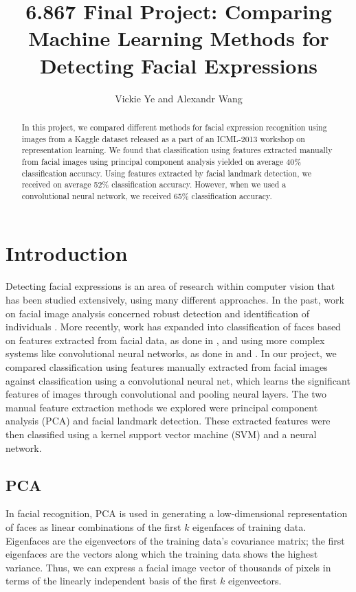 \documentclass[10pt, twocolumn, twoside]{article}
\title{6.867 Final Project: Comparing Machine Learning Methods for Detecting Facial Expressions} %
\date{}
\author {Vickie Ye and Alexandr Wang}
\begin{document}
\maketitle


\begin{abstract}
In this project, we compared different methods for facial expression recognition
using images from a Kaggle dataset released as a part of an ICML-2013 workshop
on representation learning.
We found that classification using features extracted manually from facial images
using principal component analysis yielded on average 40\% classification accuracy.
Using features extracted by facial landmark detection, we received on average 52\%
classification accuracy. However, when we used a convolutional neural network, we
received 65\% classification accuracy.
\end{abstract}

\section{Introduction}

Detecting facial expressions is an area of research within computer vision that has
been studied extensively, using many different approaches. In the past, work on
facial image analysis concerned robust detection and identification of individuals
\cite{Samal}. More recently, work has expanded into classification of faces based on
features extracted from facial data, as done in \cite{Bartlett}, and using more complex
systems like convolutional neural networks, as done in \cite{Lawrence} and \cite{Matsugi}.
In our project, we compared classification using features manually extracted from
facial images against classification using a convolutional neural net, which learns
the significant features of images through convolutional and pooling neural layers.
The two manual feature extraction methods we explored were principal component
analysis (PCA) and facial landmark detection. These extracted features were then
classified using a kernel support vector machine (SVM) and a neural network.

\subsection{PCA}

In facial recognition, PCA is used in generating a low-dimensional representation of
faces as linear combinations of the first $k$ eigenfaces of training data.
Eigenfaces are the eigenvectors of the training data's covariance matrix; the first
eigenfaces are the vectors along which the training data shows the highest variance.
Thus, we can express a facial image vector of thousands of pixels in terms of
the linearly independent basis of the first $k$ eigenvectors. 
\end{document}
